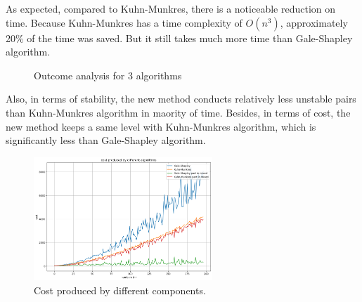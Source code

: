 \documentclass[14pt]{extarticle}
\begin{document}
As expected, compared to Kuhn-Munkres, there is a noticeable reduction on time. 
Because Kuhn-Munkres has a time complexity of $O(n^3)$, approximately 20\% of the time was saved.
But it still takes much more time than Gale-Shapley algorithm.

\begin{figure}[H]
  \centering
  \quad
  \caption{Outcome analysis for 3 algorithms}
\end{figure}

Also, in terms of stability, the new method conducts relatively less unstable pairs than Kuhn-Munkres algorithm in maority of time.
Besides, in terms of cost, the new method keeps a same level with Kuhn-Munkres algorithm, which is significantly less than Gale-Shapley algorithm.

\begin{figure}[H]
  \centering
  \includegraphics[width=0.6\textwidth]{cost_produced_by_different_algorithms.png}
  \caption{Cost produced by different components.}
\end{figure} 
\end{document}
